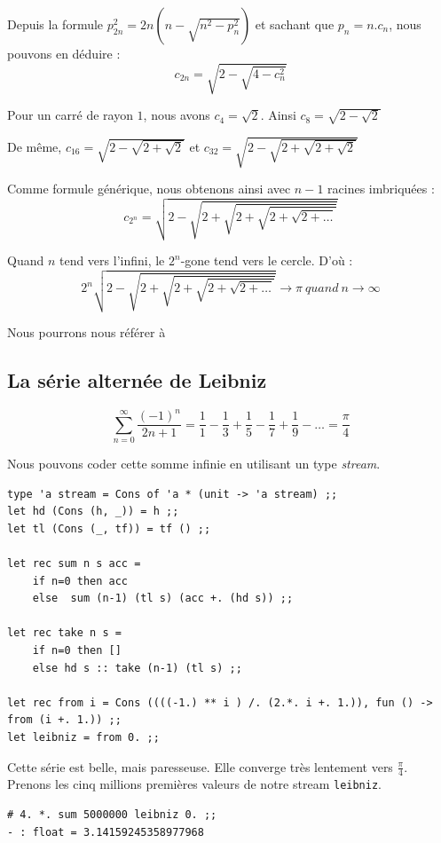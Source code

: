 \vspace{1cm}
Depuis la formule $  p_{2n}^2 = 2n (n - \sqrt{n^2-p_n^2})  $ et sachant que $p_n = n.c_n$, 
nous pouvons en déduire :
$$ c_{2n} = \sqrt{2-\sqrt{4-c_n^2}} $$

Pour un carré de rayon $1$, nous avons $c_4=\sqrt{2}$. Ainsi $c_8= \sqrt{2-\sqrt{2}}$

De même, $c_{16}=\sqrt{2-\sqrt{2+\sqrt{2}}} $  et $c_{32}=\sqrt{2-\sqrt{2+\sqrt{2+\sqrt2}}} $

Comme formule générique, nous obtenons ainsi avec $n-1$ racines imbriquées :
$$c_{2^n}=\sqrt{2-\sqrt{2+\sqrt{2+\sqrt{2+\sqrt{2+\dots}}}}}$$ 

Quand $n$ tend vers l'infini, le $2^n$-gone tend vers le cercle. D'où :
$$ 2^n \sqrt{2-\sqrt{2+\sqrt{2+\sqrt{2+\sqrt{2+\dots}}}}} \rightarrow \pi\ quand\ n \rightarrow \infty $$

Nous pourrons nous référer à \cite{wm}


\subsection{La série alternée de Leibniz}
\[ \sum_{n=0}^\infty \frac{(-1)^n}{2n+1} = \frac{1}{1} -\frac{1}{3}+\frac{1}{5}-\frac{1}{7}+\frac{1}{9} - \dots = \frac{\pi}{4}  \]

Nous pouvons coder cette somme infinie en utilisant un type \textit{stream}. 

\begin{Verbatim}
type 'a stream = Cons of 'a * (unit -> 'a stream) ;;
let hd (Cons (h, _)) = h ;;
let tl (Cons (_, tf)) = tf () ;;

let rec sum n s acc =
	if n=0 then acc
	else  sum (n-1) (tl s) (acc +. (hd s)) ;;

let rec take n s =
	if n=0 then []
	else hd s :: take (n-1) (tl s) ;;

let rec from i = Cons ((((-1.) ** i ) /. (2.*. i +. 1.)), fun () -> from (i +. 1.)) ;;
let leibniz = from 0. ;;
\end{Verbatim}


Cette série est belle, mais paresseuse. Elle converge très lentement vers $\frac{\pi}{4}$. 
Prenons les cinq millions premières valeurs de notre stream \verb+leibniz+.
\begin{Verbatim}
# 4. *. sum 5000000 leibniz 0. ;;
- : float = 3.14159245358977968
\end{Verbatim}



